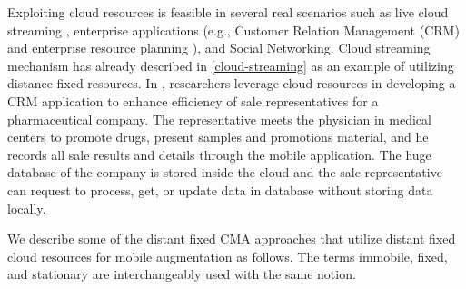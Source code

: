 \documentclass[publish]{IEEEtran}
\begin{document}
Exploiting cloud resources is feasible in several real scenarios such as live cloud streaming \cite{Lawton2012}, enterprise applications (e.g., Customer Relation Management (CRM) and enterprise resource planning \cite{Hariharan2008}), and Social Networking. Cloud streaming mechanism has already described in \ref{cloud-streaming} as an example of utilizing distance fixed resources. In \cite{Hariharan2008}, researchers leverage cloud resources in developing a CRM application to enhance efficiency of sale representatives for a pharmaceutical company. The representative meets the physician in medical centers to promote drugs, present samples and promotions material, and he records all sale results and details through the mobile application. The huge database of the company is stored inside the cloud and the sale representative can request to process, get, or update data in database without storing data locally. 

We describe some of the distant fixed CMA approaches that utilize distant fixed cloud resources for mobile augmentation as follows. The terms immobile, fixed, and stationary are interchangeably used with the same notion.
\end{document}
